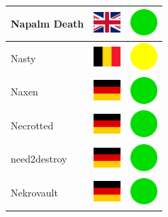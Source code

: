 \documentclass[12pt, a4paper, twoside]{report}
\begin{document}
\begin{center}
\begin{longtable}{|p{5cm}|p{2cm}|p{2cm}|}
Napalm Death & \includegraphics[width=1cm]{4x3/gb} & \includegraphics[width=1cm]{likes/y} \\ \hline
Nasty & \includegraphics[width=1cm]{4x3/be} & \includegraphics[width=1cm]{likes/m} \\ \hline
Naxen & \includegraphics[width=1cm]{4x3/de} & \includegraphics[width=1cm]{likes/y} \\ \hline
Necrotted & \includegraphics[width=1cm]{4x3/de} & \includegraphics[width=1cm]{likes/y} \\ \hline
need2destroy & \includegraphics[width=1cm]{4x3/de} & \includegraphics[width=1cm]{likes/y} \\ \hline
Nekrovault & \includegraphics[width=1cm]{4x3/de} & \includegraphics[width=1cm]{likes/y} \\ \hline

\end{longtable}
\end{center}
\end{document}
